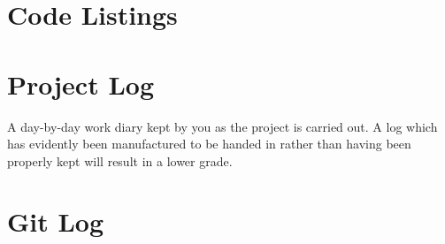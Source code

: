 \documentclass[a4paper,oneside]{report}
\begin{document}
	\appendix
	
	\chapter{Code Listings}

	\chapter{Project Log}
	
A day-by-day work diary kept by you as the project is carried out. A log which has evidently been manufactured to be handed in rather than having been properly kept will result in a lower grade.

	\chapter{Git Log}


	
%
%

\newpage
{}


\end{document}
